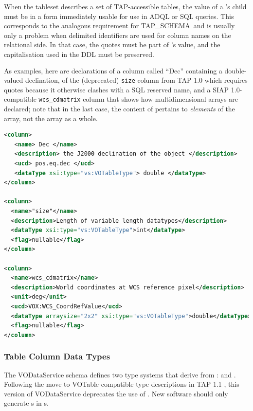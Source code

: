 \documentclass[11pt,a4paper]{ivoa}
\newcommand{\tapschema}{TAP\_SCHE\-MA}
\newcommand{\tapschema}{\mbox{%
  TAP\discretionary{-}{}{\kern-2pt\_}SCHEMA}}
\begin{document}
When the tableset describes a set of TAP-accessible tables, the value of
a 's  child must be in a form immediately
usable for use in ADQL or SQL queries. This corresponds to the analogous
requirement for \tapschema\ and is usually only a problem when delimited
identifiers are used for column names on the relational side.  In that
case, the quotes must be part of 's value, and the
capitalisation used in the DDL must be preserved.


As examples, here are declarations of a column called ``Dec'' containing
a double-valued declination, of the (deprecated) \verb|size| column
from TAP 1.0 which requires quotes because it otherwise clashes with a
SQL reserved name, and a SIAP 1.0-compatible \verb|wcs_cdmatrix|
column that shows how multidimensional arrays are declared; note that in
the last case, the content of  pertains to \emph{elements}
of the array, not the array as a whole.

\begin{lstlisting}[language=XML,basicstyle=\footnotesize]
<column>
   <name> Dec </name>
   <description> the J2000 declination of the object </description>
   <ucd> pos.eq.dec </ucd>
   <dataType xsi:type="vs:VOTableType"> double </dataType>
</column>

<column>
  <name>"size"</name>
  <description>Length of variable length datatypes</description>
  <dataType xsi:type="vs:VOTableType">int</dataType>
  <flag>nullable</flag>
</column>

<column>
  <name>wcs_cdmatrix</name>
  <description>World coordinates at WCS reference pixel</description>
  <unit>deg</unit>
  <ucd>VOX:WCS_CoordRefValue</ucd>
  <dataType arraysize="2x2" xsi:type="vs:VOTableType">double</dataType>
  <flag>nullable</flag>
</column>
\end{lstlisting}


\subsubsection{Table Column Data Types}
\label{sect:tbldatatypes}


The VODataService schema defines two type systems that derive from
:   and
.  Following the move to VOTable-compatible type
descriptions in TAP 1.1 \citep{2019ivoa.spec.0927D}, this version of
VODataService deprecates the use of .  New software
should only generate s in s.
\end{document}
